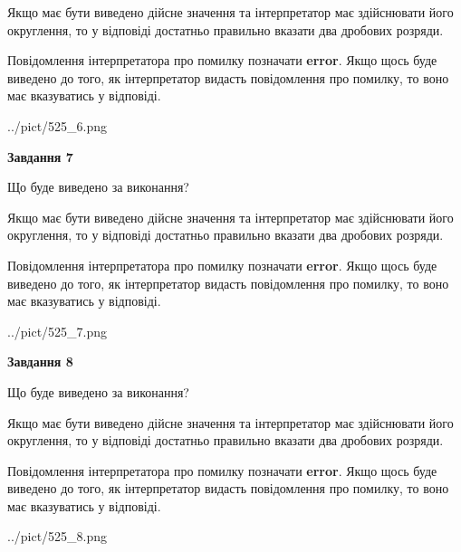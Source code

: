 \documentclass[12pt, ukrainian]{article}
\begin{document}
{\begin {Large}
Якщо має бути виведено дійсне значення та інтерпретатор має здійснювати його округлення, 
то у відповіді достатньо правильно вказати два дробових розряди.

Повідомлення інтерпретатора про помилку позначати \textbf{error}.
Якщо щось буде виведено до того, як інтерпретатор видасть повідомлення про помилку, 
то воно має вказуватись у відповіді. \par

\begin{center}
	{../pict/525_6.png}
\end{center}
\newpage

{\begin {center}\textbf{Завдання 7}\end {center}}\par
Що буде виведено за виконання? \par

Якщо має бути виведено дійсне значення та інтерпретатор має здійснювати його округлення, 
то у відповіді достатньо правильно вказати два дробових розряди.

Повідомлення інтерпретатора про помилку позначати \textbf{error}.
Якщо щось буде виведено до того, як інтерпретатор видасть повідомлення про помилку, 
то воно має вказуватись у відповіді. \par

\begin{center}
	{../pict/525_7.png}
\end{center}
\newpage

{\begin {center}\textbf{Завдання 8}\end {center}}\par
Що буде виведено за виконання? \par

Якщо має бути виведено дійсне значення та інтерпретатор має здійснювати його округлення, 
то у відповіді достатньо правильно вказати два дробових розряди.

Повідомлення інтерпретатора про помилку позначати \textbf{error}.
Якщо щось буде виведено до того, як інтерпретатор видасть повідомлення про помилку, 
то воно має вказуватись у відповіді. \par

\begin{center}
	{../pict/525_8.png}
\end{center}
\newpage


\end{Large}}
\end{document}

